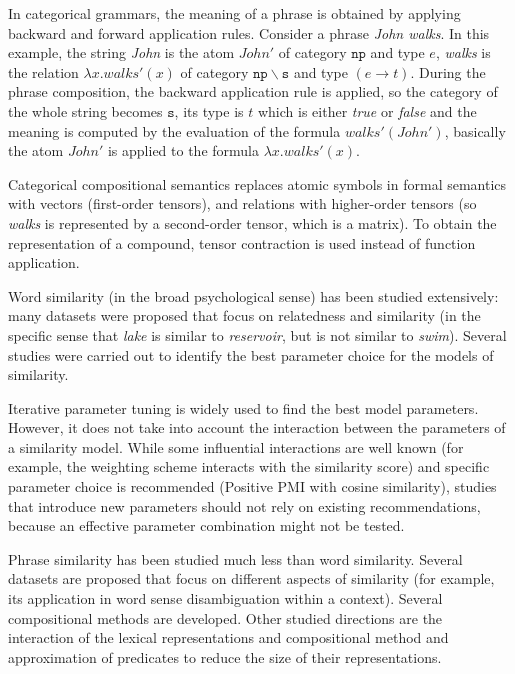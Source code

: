 In categorical grammars, the meaning of a phrase is obtained by applying backward and forward application rules. Consider a phrase \textit{John walks}. In this example, the string \textit{John} is the atom $\mathit{John'}$ of category $\mathtt{np}$ and type $e$, \textit{walks} is the relation $\lambda x.\mathit{walks'}(x)$ of category $\mathtt{np\backslash{}s}$ and type $(e \to t)$. During the phrase composition, the backward application rule is applied, so the category of the whole string becomes $\mathtt{s}$, its type is $t$ which is either \textit{true} or \textit{false} and the meaning is computed by the evaluation of the formula $\mathit{walks'}(\mathit{John'})$, basically the atom $\mathit{John'}$ is applied to the formula $\lambda x.\mathit{walks'(x)}$.

Categorical compositional semantics replaces atomic symbols in formal semantics with vectors (first-order tensors), and relations with higher-order tensors (so \textit{walks} is represented by a second-order tensor, which is a matrix). To obtain the representation of a compound, tensor contraction is used instead of function application.

Word similarity (in the broad psychological sense) has been studied extensively: many datasets were proposed that focus on relatedness and similarity (in the specific sense that \textit{lake} is similar to \textit{reservoir}, but is not similar to \textit{swim}). Several studies were carried out to identify the best parameter choice for the models of similarity.

Iterative parameter tuning is widely used to find the best model parameters. However, it does not take into account the interaction between the parameters of a similarity model. While some influential interactions are well known (for example, the weighting scheme interacts with the similarity score) and specific parameter choice is recommended (Positive PMI with cosine similarity), studies that introduce new parameters should not rely on existing recommendations, because an effective parameter combination might not be tested.

Phrase similarity has been studied much less than word similarity. Several datasets are proposed that focus on different aspects of similarity (for example, its application in word sense disambiguation within a context). Several compositional methods are developed. Other studied directions are the interaction of the lexical representations and compositional method and approximation of predicates to reduce the size of their representations.

